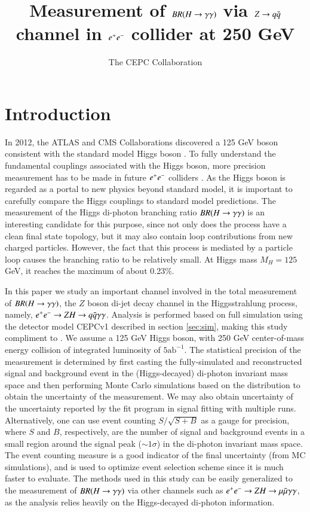 \documentclass[11pt,a4paper]{cepcnote}
\title{Measurement of $BR(H\rightarrow\gamma\gamma)$ via $Z\rightarrow q\bar q$ channel in $e^+ e^-$ collider at 250 GeV}
\author{The CEPC Collaboration}
\begin{document}

\section{Introduction}
In 2012, the ATLAS and CMS Collaborations discovered a 125 GeV boson consistent with the standard model Higgs boson \cite{Aad:2012tfa, Chatrchyan:2012xdj}. %
To fully understand the fundamental couplings associated with the Higgs boson, more precision measurement has to be made in future $e^+ e^-$ colliders \cite{Accomando:1997wt}. As the Higgs boson is regarded as a portal to new physics beyond standard model, it is important to carefully compare the Higgs couplings to standard model predictions. The measurement of the Higgs di-photon branching ratio $BR(H\rightarrow\gamma\gamma)$ is an interesting candidate for this purpose, since not only does the process have a clean final state topology, but it may also contain loop contributions from new charged particles.
However, the fact that this process is mediated by a particle loop causes the branching ratio to be relatively small. At Higgs mass $M_H=125$ GeV, it reaches the maximum of about 0.23\%\cite{Actis:2008ts}.

In this paper we study an important channel involved in the total measurement of $BR(H\rightarrow\gamma\gamma)$, the $Z$ boson di-jet decay channel in the Higgsstrahlung process, namely, $e^+ e^-\rightarrow ZH\rightarrow q\bar q\gamma\gamma$. Analysis is performed based on full simulation using the detector model CEPCv1 described in section \ref{sec:sim}, making this study compliment to \cite{Feng:MC}. We assume a 125 GeV Higgs boson, with 250 GeV center-of-mass energy collision of integrated luminosity of $5\text{ab}^{-1}$. The statistical precision of the measurement is determined by first casting the fully-simulated and reconstructed signal and background event in the (Higgs-decayed) di-photon invariant mass space and then performing Monte Carlo simulations based on the distribution to obtain the uncertainty of the measurement. We may also obtain uncertainty of the uncertainty reported by the fit program in signal fitting with multiple runs. Alternatively, one can use event counting $S/\sqrt{S+B}$ as a gauge for precision, where $S$ and $B$, respectively, are the number of signal and background events in a small region around the signal peak ($\sim1\sigma$) in the di-photon invariant mass space. The event counting measure is a good indicator of the final uncertainty (from MC simulations), and is used to optimize event selection scheme since it is much faster to evaluate.
The methods used in this study can be easily generalized to the measurement of $BR(H\rightarrow\gamma\gamma)$ via other channels such as $e^+ e^-\rightarrow ZH\rightarrow \mu\bar\mu\gamma\gamma$, as the analysis relies heavily on the Higgs-decayed di-photon information.
\end{document}
